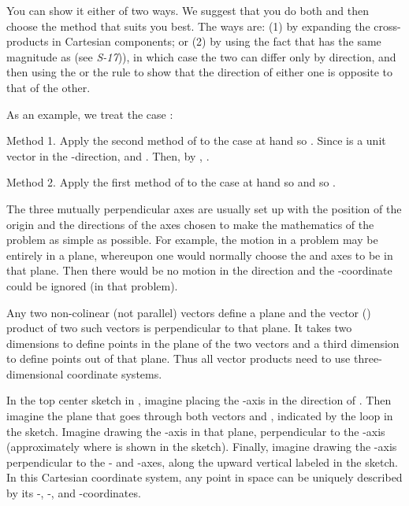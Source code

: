 {
{You can show it either of two ways.
We suggest that you do both and then choose the method that suits you best.
The ways are:
(1) by expanding the cross-products in Cartesian components; or
(2) by using the fact that  has the same magnitude as
 (see \textit{S-17})), in which case the two can differ only by direction,
and then using the  or the  rule to show that
the direction of either one is opposite to that of the other.}

{As an example, we treat the case :
\smallskip

Method 1. Apply the second method of  to the case at hand so .  Since  is a unit vector in the -direction,  and .  Then, by , .
\smallskip

Method 2. Apply the first method of  to the case at hand so  and  so .

}

{The three mutually perpendicular axes are usually set up with the position of the origin and the
directions of the axes chosen to make the mathematics of the problem as simple as possible.  For
example, the motion in a problem may be entirely in a plane, whereupon one would normally choose
the  and  axes to be in that plane.  Then there would be no motion in the 
direction and the -coordinate could be ignored (in that problem).
\smallskip

Any two non-colinear (not parallel) vectors define a plane and the vector () product of
two such vectors is perpendicular to that plane.
It takes two dimensions to define points in the plane of the two vectors and a third dimension to define
points out of that plane.
Thus all vector products need to use three-dimensional coordinate systems.
\smallskip

In the top center sketch in , imagine placing the -axis in the direction of .
Then imagine the plane that goes through both vectors  and , indicated by the loop in the
sketch.
Imagine drawing the -axis in that plane, perpendicular to the -axis (approximately where
 is shown in the sketch).
Finally, imagine drawing the -axis perpendicular to the - and -axes, along the upward
vertical labeled  in the sketch.
In this Cartesian coordinate system, any point in space can be uniquely described by its
-, -, and -coordinates.
}

}%

